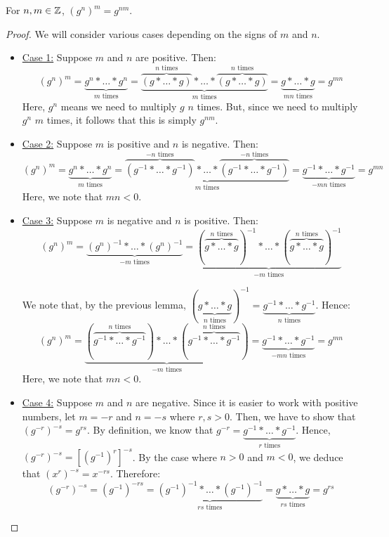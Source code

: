 \documentclass[letterpaper]{article}
\begin{document}
\begin{lemma}{}{}
    For $n, m \in \mathbb{Z}$, $(g^n)^m = g^{nm}$. 
\end{lemma}

\begin{mdframed}
    \begin{proof}
        We will consider various cases depending on the signs of $m$ and $n$. 
        \begin{itemize}
            \item \underline{Case 1:} Suppose $m$ and $n$ are positive. Then: 
            \[(g^n)^m = \underbrace{g^n * \dots * g^n}_{m \text{ times}} = \underbrace{\overbrace{(g * \dots * g)}^{n \text{ times}} * \dots * \overbrace{(g * \dots * g)}^{n \text{ times}}}_{m \text{ times}} = \underbrace{g * \dots * g}_{mn \text{ times}} = g^{mn}\]
            Here, $g^n$ means we need to multiply $g$ $n$ times. But, since we need to multiply $g^n$ $m$ times, it follows that this is simply $g^{nm}$.  

            \item \underline{Case 2:} Suppose $m$ is positive and $n$ is negative. Then: 
            \[(g^n)^m = \underbrace{g^n * \dots * g^n}_{m \text{ times}} = \underbrace{\overbrace{(g^{-1} * \dots * g^{-1})}^{-n \text{ times}} * \dots * \overbrace{(g^{-1} * \dots * g^{-1})}^{-n \text{ times}}}_{m \text{ times}} = \underbrace{g^{-1} * \dots * g^{-1}}_{-mn \text{ times}} = g^{mn}\]
            Here, we note that $mn < 0$. 

            \item \underline{Case 3:} Suppose $m$ is negative and $n$ is positive. Then: 
            \[(g^n)^m = \underbrace{(g^n)^{-1} * \dots * (g^n)^{-1}}_{-m \text{ times}} = \underbrace{(\overbrace{g * \dots * g}^{n \text{ times}})^{-1} * \dots * (\overbrace{g * \dots * g}^{n \text{ times}})^{-1}}_{-m \text{ times}}\]

            We note that, by the previous lemma, $(\underbrace{g * \dots * g}_{n \text{ times}})^{-1} = \underbrace{g^{-1} * \dots * g^{-1}}_{n \text{ times}}$. Hence: 
            \[(g^n)^m = \underbrace{(\overbrace{g^{-1} * \dots * g^{-1}}^{n \text{ times}}) * \dots * (\overbrace{g^{-1} * \dots * g^{-1}}^{n \text{ times}})}_{-m \text{ times}} = \underbrace{g^{-1} * \dots * g^{-1}}_{-mn \text{ times}} = g^{mn}\]
            Here, we note that $mn < 0$.  

            \item \underline{Case 4:} Suppose $m$ and $n$ are negative. Since it is easier to work with positive numbers, let $m = -r$ and $n = -s$ where $r, s > 0$. Then, we have to show that $(g^{-r})^{-s} = g^{rs}$. By definition, we know that $g^{-r} = \underbrace{g^{-1} * \dots * g^{-1}}_{r \text{ times}}$. Hence, $(g^{-r})^{-s} = [(g^{-1})^r]^{-s}$. By the case where $n > 0$ and $m < 0$, we deduce that $(x^r)^{-s} = x^{-rs}$. Therefore: 
            \[(g^{-r})^{-s} = (g^{-1})^{-rs} = \underbrace{(g^{-1})^{-1} * \dots * (g^{-1})^{-1}}_{rs \text{ times}} = \underbrace{g * \dots * g}_{rs \text{ times}} = g^{rs}\]


\end{itemize}
\end{proof}
\end{mdframed}
\end{document}
